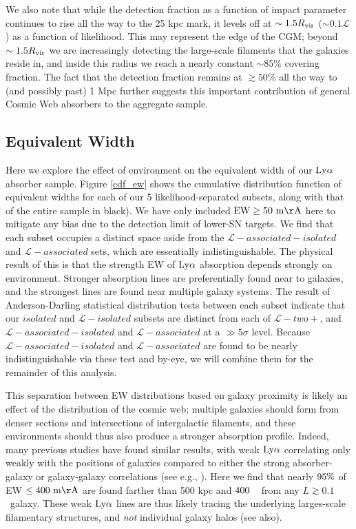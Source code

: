 We also note that while the detection fraction as a function of impact parameter continues to rise all the way to the 25 kpc mark, it levels off at $\sim 1.5 R_{\rm vir}$ ($\sim 0.1 \mathcal{L}$) as a function of likelihood. This may represent the edge of the CGM; beyond $\sim 1.5 R_{\rm vir}$ we are increasingly detecting the large-scale filaments that the galaxies reside in, and inside this radius we reach a nearly constant $\sim85\%$ covering fraction. The fact that the detection fraction remains at $\gtrsim 50\%$ all the way to (and possibly past) 1 Mpc further suggests this important contribution of general Cosmic Web absorbers to the aggregate sample.


\subsection{Equivalent Width}
Here we explore the effect of environment on the equivalent width of our $\rm Ly\alpha$ absorber sample. Figure \ref{cdf_ew} shows the cumulative distribution function of equivalent widths for each of our 5 likelihood-separated subsets, along with that of the entire sample in black). We have only included $\rm EW \ge 50~m\AA$ here to mitigate any bias due to the detection limit of lower-SN targets. We find that each subset occupies a distinct space aside from the $\mathcal{L}-associated-isolated$ and $\mathcal{L}-associated$ sets, which are essentially indistinguishable. The physical result of this is that the strength EW of $\rm Ly\alpha$ absorption depends strongly on environment. Stronger absorption lines are preferentially found near to galaxies, and the strongest lines are found near multiple galaxy systems. The result of Anderson-Darling statistical distribution tests between each subset indicate that our $isolated$ and $\mathcal{L}-isolated$ subsets are distinct from each of $\mathcal{L}-two+$, and $\mathcal{L}-associated-isolated$ and $\mathcal{L}-associated$ at a $\gg 5 \sigma$ level. Because $\mathcal{L}-associated-isolated$ and $\mathcal{L}-associated$ are found to be nearly indistinguishable via these test and by-eye, we will combine them for the remainder of this analysis.


This separation between EW distributions based on galaxy proximity is likely an effect of the distribution of the cosmic web; multiple galaxies should form from denser sections and intersections of intergalactic filaments, and these environments should thus also produce a stronger absorption profile. Indeed, many previous studies have found similar results, with weak $\rm Ly\alpha$ correlating only weakly with the positions of galaxies compared to either the strong absorber-galaxy or galaxy-galaxy correlations (see e.g., \citealt{chen2005, morris2006, wilman2007, chen2009}). Here we find that nearly $\rm 95\%$ of EW $\rm \leq 400~m\AA$ are found farther than 500 kpc and $\rm 400$ \kms~ from any $L \gtrsim 0.1$\Lstar~galaxy. These weak $\rm Ly\alpha$ lines are thus likely tracing the underlying larges-scale filamentary structures, and \emph{not} individual galaxy halos (see \citealt{tripp1998, wakker2015} also).


